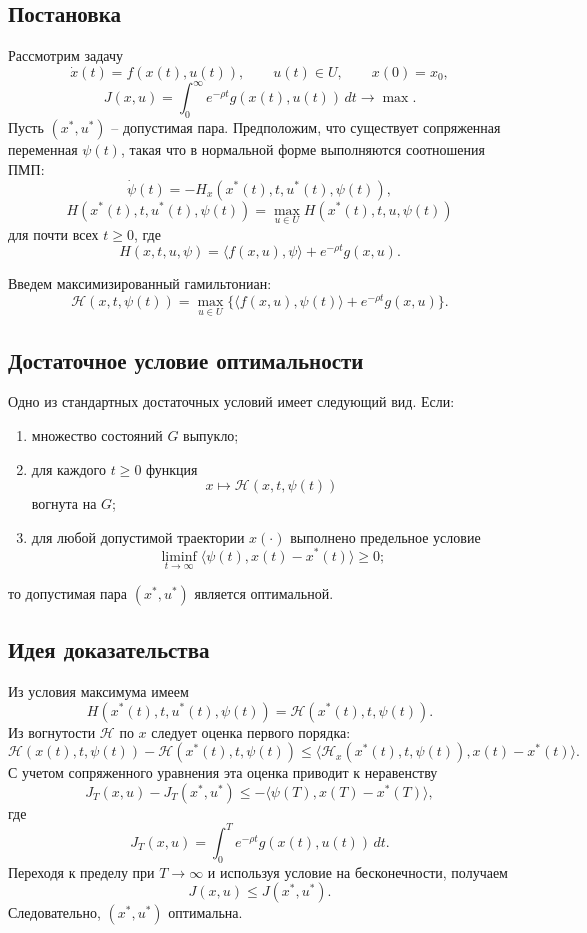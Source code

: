 \documentclass[12pt,a4paper]{article}
\begin{document}
\subsection{Постановка}

Рассмотрим задачу
\[
    \dot x(t)=f(x(t),u(t)),
    \qquad
    u(t)\in U,
    \qquad
    x(0)=x_0,
\]
\[
    J(x,u)=\int_0^\infty e^{-\rho t}g(x(t),u(t))\,dt\to\max.
\]
Пусть \((x^*,u^*)\) -- допустимая пара. Предположим, что существует сопряженная переменная \(\psi(t)\), такая что в нормальной форме выполняются соотношения ПМП:
\[
    \dot\psi(t)=-H_x(x^*(t),t,u^*(t),\psi(t)),
\]
\[
    H(x^*(t),t,u^*(t),\psi(t))
    =\max_{u\in U}H(x^*(t),t,u,\psi(t))
\]
для почти всех \(t\ge0\), где
\[
    H(x,t,u,\psi)=\langle f(x,u),\psi\rangle+e^{-\rho t}g(x,u).
\]

Введем максимизированный гамильтониан:
\[
    \mathcal H(x,t,\psi(t))
    =\max_{u\in U}\{\langle f(x,u),\psi(t)\rangle+e^{-\rho t}g(x,u)\}.
\]

\subsection{Достаточное условие оптимальности}

Одно из стандартных достаточных условий имеет следующий вид. Если:
\begin{enumerate}
    \item множество состояний \(G\) выпукло;
    \item для каждого \(t\ge0\) функция
    \[
        x\mapsto \mathcal H(x,t,\psi(t))
    \]
    вогнута на \(G\);
    \item для любой допустимой траектории \(x(\cdot)\) выполнено предельное условие
    \[
        \liminf_{t\to\infty}\langle \psi(t),x(t)-x^*(t)\rangle\ge0;
    \]
\end{enumerate}
то допустимая пара \((x^*,u^*)\) является оптимальной.

\subsection{Идея доказательства}

Из условия максимума имеем
\[
    H(x^*(t),t,u^*(t),\psi(t))=\mathcal H(x^*(t),t,\psi(t)).
\]
Из вогнутости \(\mathcal H\) по \(x\) следует оценка первого порядка:
\[
    \mathcal H(x(t),t,\psi(t))-\mathcal H(x^*(t),t,\psi(t))
    \le
    \langle \mathcal H_x(x^*(t),t,\psi(t)),x(t)-x^*(t)\rangle.
\]
С учетом сопряженного уравнения эта оценка приводит к неравенству
\[
    J_T(x,u)-J_T(x^*,u^*)
    \le
    -\langle \psi(T),x(T)-x^*(T)\rangle,
\]
где
\[
    J_T(x,u)=\int_0^T e^{-\rho t}g(x(t),u(t))\,dt.
\]
Переходя к пределу при \(T\to\infty\) и используя условие на бесконечности, получаем
\[
    J(x,u)\le J(x^*,u^*).
\]
Следовательно, \((x^*,u^*)\) оптимальна.
\end{document}

